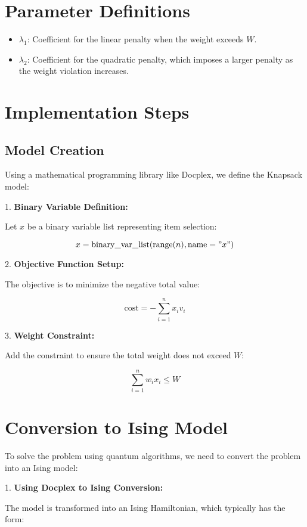 \documentclass{article}
\begin{document}
\section{Parameter Definitions}

\begin{itemize}
    \item \( \lambda_1 \): Coefficient for the linear penalty when the weight exceeds \( W \).
    \item \( \lambda_2 \): Coefficient for the quadratic penalty, which imposes a larger penalty as the weight violation increases.
\end{itemize}

\section{Implementation Steps}

\subsection{Model Creation}

Using a mathematical programming library like Docplex, we define the Knapsack model:

1. \textbf{Binary Variable Definition:}

   Let \( x \) be a binary variable list representing item selection:

   \[
   x = \text{binary\_var\_list}(\text{range}(n), \text{name}="x")
   \]

2. \textbf{Objective Function Setup:}

   The objective is to minimize the negative total value:

   \[
   \text{cost} = -\sum_{i=1}^{n} x_i v_i
   \]

3. \textbf{Weight Constraint:}

   Add the constraint to ensure the total weight does not exceed \( W \):

   \[
   \sum_{i=1}^{n} w_i x_i \leq W
   \]

\section{Conversion to Ising Model}

To solve the problem using quantum algorithms, we need to convert the problem into an Ising model:

1. \textbf{Using Docplex to Ising Conversion:}

   The model is transformed into an Ising Hamiltonian, which typically has the form:
\end{document}

